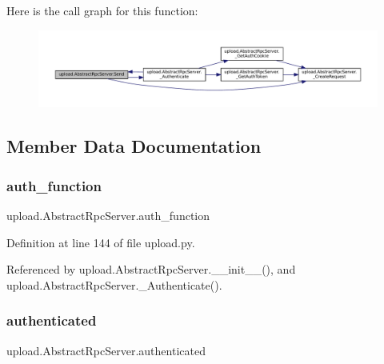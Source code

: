 Here is the call graph for this function\+:
\nopagebreak
\begin{figure}[H]
\begin{center}
\leavevmode
\includegraphics[width=350pt]{classupload_1_1AbstractRpcServer_ac1b913f8bd00da4741c47ab49ea94cb5_cgraph}
\end{center}
\end{figure}


\subsection{Member Data Documentation}
\mbox{\label{classupload_1_1AbstractRpcServer_aee0090a3bcf07b913a7dd596a5dabb8f}} 
\subsubsection{\texorpdfstring{auth\+\_\+function}{auth\_function}}
{\footnotesize\ttfamily upload.\+Abstract\+Rpc\+Server.\+auth\+\_\+function}



Definition at line 144 of file upload.\+py.



Referenced by upload.\+Abstract\+Rpc\+Server.\+\_\+\+\_\+init\+\_\+\+\_\+(), and upload.\+Abstract\+Rpc\+Server.\+\_\+\+Authenticate().

\mbox{\label{classupload_1_1AbstractRpcServer_a692955750c802e461c6336d3000cd365}} 
\subsubsection{\texorpdfstring{authenticated}{authenticated}}
{\footnotesize\ttfamily upload.\+Abstract\+Rpc\+Server.\+authenticated}



